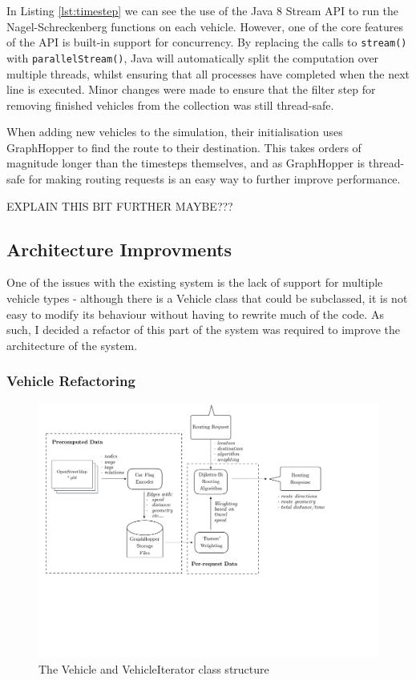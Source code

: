 \documentclass[ %
                    author={Alexander Hill},
                supervisor={Dr. Benjamin Sach},
                    degree={MEng},
                     title={MARMOSET},
                  subtitle={Multi-Agent Route Management using Online Simulation for Efficient Transportation},
                      type={research},
                      year={2016} ]{dissertation}
\begin{document}
In Listing \ref{lst:timestep} we can see the use of the Java 8 Stream API to run
the Nagel-Schreckenberg functions on each vehicle. However, one of the core
features of the API is built-in support for concurrency. By replacing the calls
to \texttt{stream()} with \texttt{parallelStream()}, Java will automatically
split the computation over multiple threads, whilst ensuring that all processes
have completed when the next line is executed. Minor changes were made to ensure
that the filter step for removing finished vehicles from the collection was
still thread-safe.

When adding new vehicles to the simulation, their initialisation uses
GraphHopper to find the route to their destination. This takes orders of
magnitude longer than the timesteps themselves, and as GraphHopper is
thread-safe for making routing requests is an easy way to further improve
performance.

EXPLAIN THIS BIT FURTHER MAYBE???

\subsection{Architecture Improvments}

One of the issues with the existing system is the lack of support for multiple
vehicle types - although there is a Vehicle class that could be subclassed, it
is not easy to modify its behaviour without having to rewrite much of the code.
As such, I decided a refactor of this part of the system was required to improve
the architecture of the system.

\subsubsection{Vehicle Refactoring}

\begin{figure}[h]
    \centering
    \includegraphics[scale=0.6,page=6,clip,trim=0 11cm 8cm 0]{architecture}
    \caption{The Vehicle and VehicleIterator class structure}\label{fig:veh-arch}
\end{figure}
\end{document}
